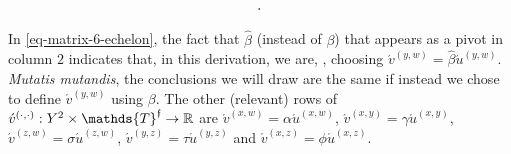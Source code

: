 \documentclass[12pt,a4paper,twoside]{article}
\newcommand{\novel}{\mathfrak f}
\newcommand{\mbbtp}{{\mathds{T} ^ \novel }}
\newcommand{\xy}{{(x, y)}}
\newcommand{\yz}{{(y,z)}}
\newcommand{\xz}{{(x,z)}}
\newcommand{\xw}{{(x,w)}}
\newcommand{\yw}{{(y,w)}}
\newcommand{\zw}{(z,w)}
\newcommand{\dd}{{(\cdot,\cdot)}}
\begin{document}
\begin{appendices}
\begin{linenomath*}
\begin{equation}
\begin{blockarray}{ccccccc}
    \end{blockarray}.
  \end{equation}
\end{linenomath*}
In \cref{eq-matrix-6-echelon}, the fact that $\hat{\beta}$ (instead of $\beta$)
that appears as a pivot in column $2$ indicates that, in this derivation, we
are, \withoutlog, choosing $\acute{v}^{\yw} = \hat{\beta}
\acute{u}^{\yw}$. \emph{Mutatis mutandis}, the conclusions we will draw are the
same if instead we chose to define $\acute{v}^{\yw}$ using $\beta$. The other
(relevant) rows of $\acute{v}^{\dd}: Y^{2} \times \mbbtp \rightarrow \R$ are
$\acute{v}^{\xw} = \alpha \acute{u}^{\xw}$,
$\acute{v}^{\xy} = \gamma \acute{u}^{\xy}$,
$\acute{v}^{\zw}= \sigma\acute{u}^{\zw}$,
$\acute{v}^{\yz} = \tau \acute{u}^{\yz}$ and
$\acute{v}^{\xz} = \phi \acute{u}^{\xz}$.  %
\begin{figure}[t]
    \begin{center}
\end{center}
\end{figure}
\end{appendices}
\end{document}
